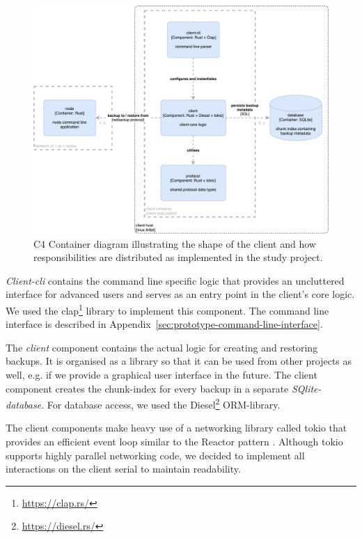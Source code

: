 \begin{figure}[h]
	\centering
	\includegraphics[width=1\linewidth]{resources/c4-client-container}
	\caption[Client specific C4 Container diagram]{C4 Container diagram illustrating the shape of the \gls{client} and how responsibilities are distributed as implemented in the study project.}
	\label{fig:c4-client-container}
\end{figure}

\emph{Client-cli} contains the command line specific logic that provides an uncluttered interface for advanced users and serves as an entry point in the client's core logic. We used the clap\footnote{\url{https://clap.rs/}} library to implement this component. The command line interface is described in Appendix~\ref{sec:prototype-command-line-interface}.

The \emph{client} component contains the actual logic for creating and restoring backups. It is organised as a library so that it can be used from other projects as well, e.g. if we provide a graphical user interface in the future. The \gls{client} component creates the \gls{chunk-index} for every backup in a separate \emph{SQlite-database}. For database access, we used the Diesel\footnote{\url{https://diesel.rs/}} ORM-library.

The \gls{client} components make heavy use of a networking library called tokio\cite{tokio-rs} that provides an efficient event loop similar to the Reactor pattern \cite{POSA1}. Although tokio supports highly parallel networking code, we decided to implement all interactions on the \gls{client} serial to maintain readability.

